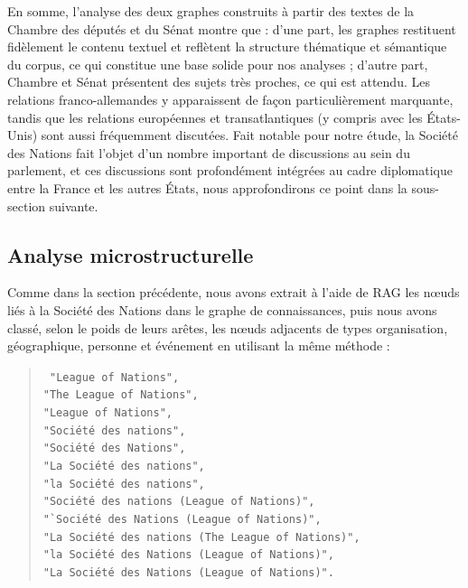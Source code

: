 \documentclass[a4paper,twoside,12pt]{book}
\begin{document}
En somme, l'analyse des deux graphes construits à partir des textes de la Chambre des députés et du Sénat montre que : d'une part, les graphes restituent fidèlement le contenu textuel et reflètent la structure thématique et sémantique du corpus, ce qui constitue une base solide pour nos analyses ; d'autre part, Chambre et Sénat présentent des sujets très proches, ce qui est attendu. Les relations franco-allemandes y apparaissent de façon particulièrement marquante, tandis que les relations européennes et transatlantiques (y compris avec les États-Unis) sont aussi fréquemment discutées. Fait notable pour notre étude, la Société des Nations fait l'objet d'un nombre important de discussions au sein du parlement, et ces discussions sont profondément intégrées au cadre diplomatique entre la France et les autres États, nous approfondirons ce point dans la sous-section suivante.

\subsection{Analyse microstructurelle}

Comme dans la section précédente, nous avons extrait à l'aide de RAG les nœuds liés à la Société des Nations dans le graphe de connaissances, puis nous avons classé, selon le poids de leurs arêtes, les nœuds adjacents de types organisation, géographique, personne et événement en utilisant la même méthode :

\begin{quote}
\texttt{
"League of Nations",\\
"The League of Nations",\\
"League of Nations",\\
"Société des nations",\\
"Société des Nations",\\
"La Société des nations",\\
"la Société des nations",\\
"Société des nations (League of Nations)",\\
"`Société des Nations (League of Nations)",\\
"La Société des nations (The League of Nations)",\\
"la Société des Nations (League of Nations)",\\
"La Société des Nations (League of Nations)".
}
\end{quote}
\end{document}
